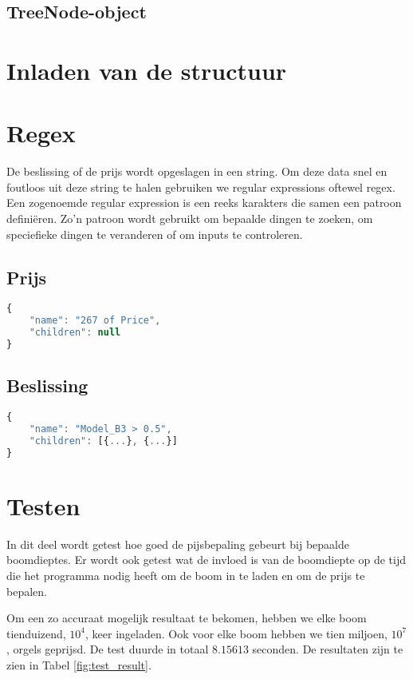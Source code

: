 \subsection{TreeNode-object}

\section{Inladen van de structuur}

\section{Regex}
De beslissing of de prijs wordt opgeslagen in een string. Om deze data snel en foutloos uit deze string te halen gebruiken we regular expressions oftewel regex. Een zogenoemde regular expression is een reeks karakters die samen een patroon definiëren. Zo'n patroon wordt gebruikt om bepaalde dingen te zoeken, om speciefieke dingen te veranderen of om inputs te controleren.\cite{wiki:regex}

\subsection{Prijs}
\begin{lstlisting}[language=JavaScript]
{
    "name": "267 of Price",
    "children": null
}
\end{lstlisting}
\subsection{Beslissing}

\begin{lstlisting}[language=JavaScript]
{
    "name": "Model_B3 > 0.5",
    "children": [{...}, {...}]
}
\end{lstlisting}

\section{Testen}
In dit deel wordt getest hoe goed de pijsbepaling gebeurt bij bepaalde boomdieptes. Er wordt ook getest wat de invloed is van de boomdiepte op de tijd die het programma nodig heeft om de boom in te laden en om de prijs te bepalen. 

Om een zo accuraat mogelijk resultaat te bekomen, hebben we elke boom tienduizend, \(10^4\), keer ingeladen. Ook voor elke boom hebben we tien miljoen, \(10^7\), orgels geprijsd. De test duurde in totaal \(8.15613\) seconden. De resultaten zijn te zien in Tabel \ref{fig:test_result}.

